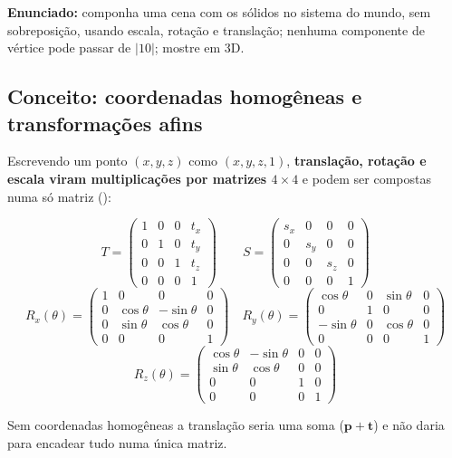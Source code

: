 \documentclass[11pt,a4paper]{article}
\newcommand{\arq}[1]{\textcolor{azulclaro}{\texttt{\detokenize{#1}}}}
\newcommand{\vetor}[1]{\mathbf{#1}}
\begin{document}
\begin{enunciado}
\textbf{Enunciado:} componha uma cena com os sólidos no sistema do mundo, sem sobreposição, usando
escala, rotação e translação; nenhuma componente de vértice pode passar de $|10|$; mostre em 3D.
\end{enunciado}

\subsection{Conceito: coordenadas homogêneas e transformações afins}

Escrevendo um ponto $(x,y,z)$ como $(x,y,z,1)$, \textbf{translação, rotação e escala viram
multiplicações por matrizes $4\times4$} e podem ser compostas numa só matriz (\arq{math_3d.py:4-57}):

\[
T = \begin{pmatrix} 1&0&0&t_x\\ 0&1&0&t_y\\ 0&0&1&t_z\\ 0&0&0&1 \end{pmatrix}
\qquad
S = \begin{pmatrix} s_x&0&0&0\\ 0&s_y&0&0\\ 0&0&s_z&0\\ 0&0&0&1 \end{pmatrix}
\]
\[
R_x(\theta) = \begin{pmatrix} 1&0&0&0\\ 0&\cos\theta&-\sin\theta&0\\ 0&\sin\theta&\cos\theta&0\\ 0&0&0&1 \end{pmatrix}
\quad
R_y(\theta) = \begin{pmatrix} \cos\theta&0&\sin\theta&0\\ 0&1&0&0\\ -\sin\theta&0&\cos\theta&0\\ 0&0&0&1 \end{pmatrix}
\]
\[
R_z(\theta) = \begin{pmatrix} \cos\theta&-\sin\theta&0&0\\ \sin\theta&\cos\theta&0&0\\ 0&0&1&0\\ 0&0&0&1 \end{pmatrix}
\]

Sem coordenadas homogêneas a translação seria uma soma ($\vetor p + \vetor t$) e não daria para
encadear tudo numa única matriz.
\end{document}
